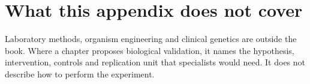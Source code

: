 \section{What this appendix does not cover}
Laboratory methods, organism engineering and clinical genetics are outside the book.
Where a chapter proposes biological validation, it names the hypothesis, intervention,
controls and replication unit that specialists would need. It does not describe how to
perform the experiment.
